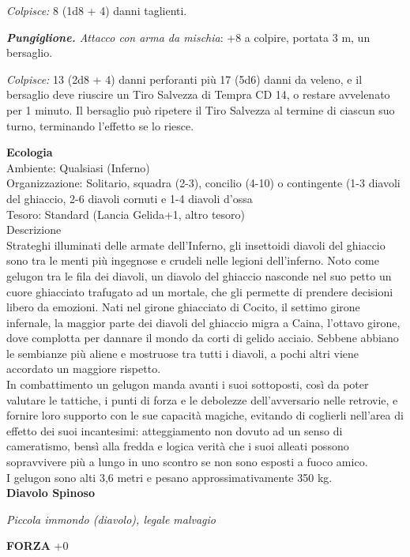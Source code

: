 \begin{multicols}{2}
\emph{Colpisce:} 8 (1d8 + 4) danni taglienti.

\emph{\textbf{Pungiglione.} Attacco con arma da mischia}: +8 a colpire, portata 3 m, un bersaglio.

\emph{Colpisce:} 13 (2d8 + 4) danni perforanti più 17 (5d6) danni da veleno, e il bersaglio deve riuscire un Tiro Salvezza di Tempra CD 14, o restare avvelenato per 1 minuto. Il bersaglio può ripetere il Tiro Salvezza al termine di ciascun suo turno, terminando l'effetto se lo riesce.

\textbf{Ecologia}\\
Ambiente: Qualsiasi (Inferno)\\
Organizzazione: Solitario, squadra (2-3), concilio (4-10) o contingente (1-3 diavoli del ghiaccio, 2-6 diavoli cornuti e 1-4 diavoli d'ossa\\
Tesoro: Standard (Lancia Gelida+1, altro tesoro)\\
Descrizione\\
Strateghi illuminati delle armate dell'Inferno, gli insettoidi diavoli del ghiaccio sono tra le menti più ingegnose e crudeli nelle legioni dell'inferno. Noto come gelugon tra le fila dei diavoli, un diavolo del ghiaccio nasconde nel suo petto un cuore ghiacciato trafugato ad un mortale, che gli permette di prendere decisioni libero da emozioni. Nati nel girone ghiacciato di Cocito, il settimo girone infernale, la maggior parte dei diavoli del ghiaccio migra a Caina, l'ottavo girone, dove complotta per dannare il mondo da corti di gelido acciaio. Sebbene abbiano le sembianze più aliene e mostruose tra tutti i diavoli, a pochi altri viene accordato un maggiore rispetto.\\
In combattimento un gelugon manda avanti i suoi sottoposti, così da poter valutare le tattiche, i punti di forza e le debolezze dell'avversario nelle retrovie, e fornire loro supporto con le sue capacità magiche, evitando di coglierli nell'area di effetto dei suoi incantesimi: atteggiamento non dovuto ad un senso di cameratismo, bensì alla fredda e logica verità che i suoi alleati possono sopravvivere più a lungo in uno scontro se non sono esposti a fuoco amico.\\
I gelugon sono alti 3,6 metri e pesano approssimativamente 350 kg.\\


\medskip{}\textbf{Diavolo Spinoso}

\emph{Piccola immondo (diavolo), legale malvagio}

\textbf{FORZA} +0


\end{multicols}
